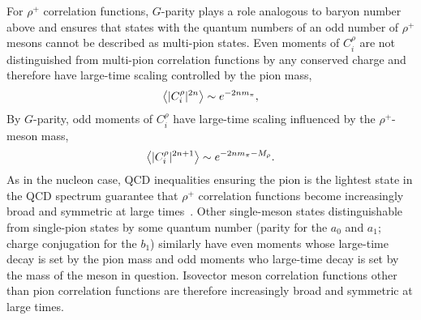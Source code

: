 For $\rho^+$ correlation functions, $G$-parity plays a role analogous to baryon number above and ensures that states with the quantum numbers of an odd number of $\rho^+$ mesons cannot be described as multi-pion states. 
Even moments of $C_i^\rho$ are not distinguished from multi-pion correlation functions by any conserved charge and therefore have large-time scaling controlled by the pion mass,
\begin{equation}
  \begin{split}
     \left< |C_i^\rho|^{2n} \right>\sim e^{-2 n m_\pi},
  \end{split}\label{eq:rhoeven}
\end{equation}
By $G$-parity, odd moments of $C_i^\rho$ have large-time scaling influenced by the $\rho^+$-meson mass,
\begin{equation}
  \begin{split}
    \left< |C_i^\rho|^{2n+1} \right> \sim e^{-2n m_\pi - M_\rho}.
  \end{split}\label{eq:rhoodd}
\end{equation}
As in the nucleon case, QCD inequalities ensuring the pion is the lightest state in the QCD spectrum  guarantee that $\rho^+$ correlation functions become increasingly broad and symmetric at large times~\cite{Weingarten:1983uj,Witten:1983ut}. 
Other single-meson states distinguishable from single-pion states by some quantum number (parity for the $a_0$ and $a_1$; charge conjugation for the $b_1$) similarly have even moments whose large-time decay is set by the pion mass and odd moments who large-time decay is set by the mass of the meson in question.
Isovector meson correlation functions other than pion correlation functions are therefore increasingly broad and symmetric at large times. 

